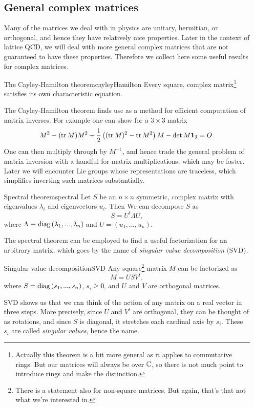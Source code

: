 \subsection{General complex matrices}

Many of the matrices we deal with in physics are unitary, hermitian,
or orthogonal, and hence they have relatively nice properties.
Later in the context of lattice QCD, we will deal with more general
complex matrices that are not guaranteed to have these properties.
Therefore we collect here some useful results for complex matrices.

\begin{theorem}{The Cayley-Hamilton theorem}{cayleyHamilton}
Every square, complex matrix\footnote{Actually this theorem is
a bit more general as it applies to commutative rings.
But our matrices will always be over $\mathbb{C}$, so there is not
much point to introduce rings and make the distinction.} 
satisfies its own characteristic equation.
\end{theorem}

The Cayley-Hamilton theorem finds use as a method for
efficient computation of matrix inverses. For
example one can show for a $3\times 3$ matrix
\begin{equation}\label{eq:inv3x3CH}
M^3-(\tr M) M^2+\frac{1}{2}\left((\tr M)^2-\tr M^2\right) M
-\det M  {\mathbf 1}_3=O.
\end{equation}
One can then multiply through by $M^{-1}$, and hence trade
the general problem of matrix inversion with a handful for matrix
multiplications, which may be faster.
Later we will encounter Lie groups whose representations
are traceless, which simplifies inverting such
matrices substantially.

\begin{theorem}{Spectral theorem}{spectral}
Let $S$ be an $n\times n$ symmetric, complex matrix with
eigenvalues $\lambda_i$ and eigenvectors $u_i$. Then
We can decompose $S$ as
$$
S=U^t\Lambda U,
$$
where $\Lambda\equiv\mathop{\mathrm{diag}}\left(\lambda_1,...,\lambda_n\right)$ and
$U=\left(u_1,...,u_n\right)$.
\end{theorem}

The spectral theorem can be employed to find a useful
factorization for an arbitrary matrix, which goes by
the name of 
{\it singular value decomposition} (SVD).
\begin{theorem}{Singular value decomposition}{SVD}
Any square\footnote{There is a statement also for non-square matrices.
But again, that's that not what we're interested in.}
matrix $M$ can be factorized as
$$
M=USV^t,
$$
where $S=\mathop{\mathrm{diag}}\left(s_1,...,s_n\right)$, $s_i\geq 0$,
and $U$ and $V$ are orthogonal matrices.
\end{theorem} 
SVD shows us that we can think of the action of any matrix on a real vector 
in three steps. More precisely, since $U$ and 
$V^t$ are orthogonal, they can be thought of
as rotations, and since $S$ is diagonal, it stretches each cardinal axis 
by $s_i$. These $s_i$ are called {\it singular values},
hence the name.

